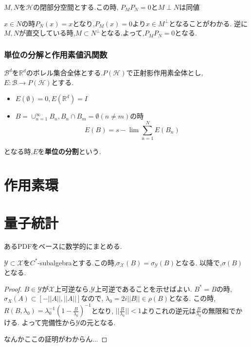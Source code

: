 \documentclass[uplatex]{jsbook}
\begin{document}
\begin{prop}
$M, N$を$\mathcal{H}$の閉部分空間とする.この時,
$P_M P_N = 0$と$M \perp N$は同値
\end{prop}
$x \in N$の時$P_N(x) = x$となり,$P_M(x) = 0$より$x \in M^{\perp}$となることがわかる.
逆に$M, N$が直交している時,$M \subset N^{\perp}$となる.よって,$P_MP_N = 0$となる.

\section{単位の分解と作用素値汎関数}
\begin{screen}
\begin{dfn}
$\mathcal{B}^d$を$\mathbb{R}^d$のボレル集合全体とする.$P(\mathcal{H})$で正射影作用素全体とし,
$E: \mathcal{B} \to P(\mathcal{H})$とする.
\begin{itemize}
  \item $E(\emptyset) = 0, E(\mathbb{R}^d) = I$
  \item $B = \cup_{n=1}^{\infty} B_n,B_n \cap B_m = \emptyset (n \neq m) $の時
  \begin{equation*}
  E(B) = s- \lim \sum_{n=1}^N E(B_n)
  \end{equation*}
\end{itemize}
となる時,$E$を\textbf{単位の分割}という.
\end{dfn}
\end{screen}

\part{作用素環}

\part{量子統計}
あるPDFをベースに数学的にまとめる.

\begin{thm}
$\mathcal{Y} \subset \mathcal{X}$を$C^*$-subalgebraとする.この時,$\sigma_{\mathcal{X}}(B) = \sigma_{\mathcal{Y}}(B)$となる.
以降で,$\sigma(B)$となる.
\end{thm}
\begin{proof}
$B \in \mathcal{Y}$が$\mathcal{X}$上可逆なら,$\mathcal{Y}$上可逆であることを示せばよい.
$B^*=B$の時,$\sigma_X(A) \subset [-||A||, ||A||]$なので,
$\lambda_0 = 2i||B|| \in \rho(B)$となる.
この時,$R(B, \lambda_0) = \lambda_0^{-1}(1 - \frac{B}{\lambda_0})^{-1}$となり,
$||\frac{B}{\lambda_0}|| < 1$よりこれの逆元は$\frac{B}{\lambda_0}$の無限和でかける.
よって完備性から$\mathcal{Y}$の元となる.

なんかここの証明がわからん...
\end{proof}
\end{document}
